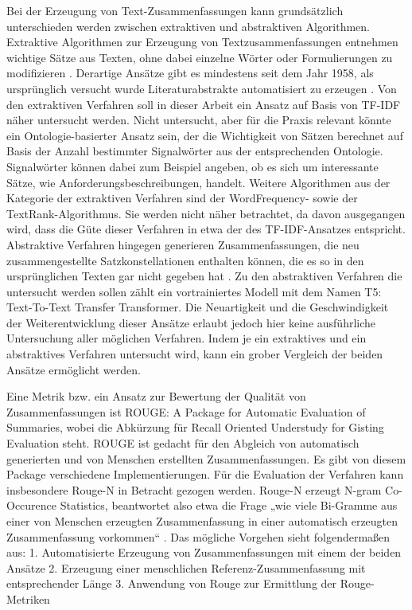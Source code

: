 Bei der Erzeugung von Text-Zusammenfassungen kann grundsätzlich unterschieden werden zwischen extraktiven und abstraktiven Algorithmen. Extraktive Algorithmen zur Erzeugung von Textzusammenfassungen entnehmen wichtige Sätze aus Texten, ohne dabei einzelne Wörter oder Formulierungen zu modifizieren \cite[S. 2]{allahyari}. Derartige Ansätze gibt es mindestens seit dem Jahr 1958, als ursprünglich versucht wurde Literaturabstrakte automatisiert zu erzeugen \cite{luhn}. Von den extraktiven Verfahren soll in dieser Arbeit ein Ansatz auf Basis von TF-IDF näher untersucht werden. Nicht untersucht, aber für die Praxis relevant könnte ein Ontologie-basierter Ansatz sein, der die Wichtigkeit von Sätzen berechnet auf Basis der Anzahl bestimmter Signalwörter aus der entsprechenden Ontologie. Signalwörter können dabei zum Beispiel angeben, ob es sich um interessante Sätze, wie Anforderungsbeschreibungen, handelt. Weitere Algorithmen aus der Kategorie der extraktiven Verfahren sind der WordFrequency- sowie der TextRank-Algorithmus. Sie werden nicht näher betrachtet, da davon ausgegangen wird, dass die Güte dieser Verfahren in etwa der des TF-IDF-Ansatzes entspricht. Abstraktive Verfahren hingegen generieren Zusammenfassungen, die neu zusammengestellte Satzkonstellationen enthalten können, die es so in den ursprünglichen Texten gar nicht gegeben hat \cite[S. 258]{Gupta}. Zu den abstraktiven Verfahren die untersucht werden sollen zählt ein vortrainiertes Modell mit dem Namen T5: Text-To-Text Transfer Transformer. 
Die Neuartigkeit und die Geschwindigkeit der Weiterentwicklung dieser Ansätze erlaubt jedoch hier keine ausführliche Untersuchung aller möglichen Verfahren. Indem je ein extraktives und ein abstraktives Verfahren untersucht wird, kann ein grober Vergleich der beiden Ansätze ermöglicht werden. 

Eine Metrik bzw. ein Ansatz zur Bewertung der Qualität von Zusammenfassungen ist ROUGE: A Package for Automatic Evaluation of Summaries, wobei die Abkürzung für Recall Oriented Understudy for Gisting Evaluation steht. ROUGE ist gedacht für den Abgleich von automatisch generierten und von Menschen erstellten Zusammenfassungen. Es gibt von diesem Package verschiedene Implementierungen. Für die Evaluation der Verfahren kann insbesondere Rouge-N in Betracht gezogen werden. Rouge-N erzeugt N-gram Co-Occurence Statistics, beantwortet also etwa die Frage „wie viele Bi-Gramme aus einer von Menschen erzeugten Zusammenfassung in einer automatisch erzeugten Zusammenfassung vorkommen“ \cite{Lin}. Das mögliche Vorgehen sieht folgendermaßen aus: 
1.	Automatisierte Erzeugung von Zusammenfassungen mit einem der beiden Ansätze
2.	Erzeugung einer menschlichen Referenz-Zusammenfassung mit entsprechender Länge
3.	Anwendung von Rouge zur Ermittlung der Rouge-Metriken 

